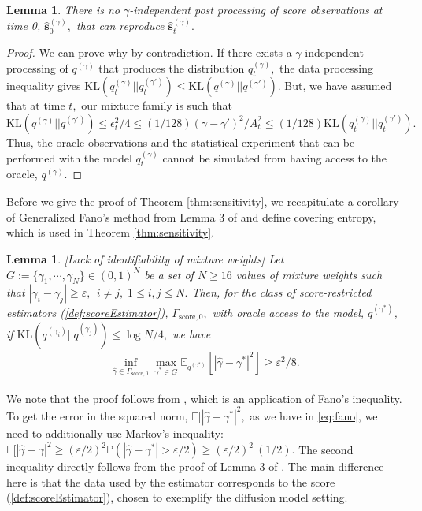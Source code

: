 \documentclass[11pt]{article}
\theoremstyle{plain}
\newtheorem{lemma}[theorem]{Lemma}
\newcommand{\1}{\mathbbm{1}}
\newcommand{\qdist}[2][]{q_{#1}^{(#2)}}
\begin{document}
\begin{appendices}
\begin{lemma}
\label{remark:dataProcessing} There is no $\gamma$-independent post processing of score observations at time 0, $\hat{\mathbf s}^{(\gamma)}_0,$ that can reproduce  $\hat{\mathbf s}^{(\gamma)}_t.$
\end{lemma}
\begin{proof}
We can prove why by contradiction. If there exists a $\gamma$-independent processing of $\qdist{\gamma}$ that produces the distribution $\qdist[t]{\gamma},$ the data processing inequality gives $\mathrm{KL}(\qdist[t]{\gamma}||\qdist[t]{\gamma'}) \leq \mathrm{KL}(\qdist{\gamma}||\qdist{\gamma'}).$ But, we have assumed that at time $t,$ our mixture family is such that $\mathrm{KL}(\qdist{\gamma}||\qdist{\gamma'}) \leq \epsilon_t^2/4 \leq (1/128) (\gamma - \gamma')^2/A_t^2 \leq (1/128)\mathrm{KL}(\qdist[t]{\gamma}||\qdist[t]{\gamma'}).$ Thus, the oracle observations and the statistical experiment that can be performed with the model $\qdist[t]{\gamma}$ cannot be simulated from having access to the oracle, $\qdist{\gamma}.$ 
\end{proof}

Before we give the proof of Theorem \ref{thm:sensitivity}, we recapitulate a corollary of Generalized Fano's method from Lemma 3 of \citep{binyu} and define covering entropy, which is used in Theorem \ref{thm:sensitivity}.
\begin{lemma}{[Lack of identifiability of mixture weights]} Let $G:= \{\gamma_1, \cdots, \gamma_N\} \in (0,1)^N$ be a set of $N\geq 16$ values of mixture weights such that $|\gamma_i - \gamma_j| \geq \varepsilon,\: \: i \neq j, \; 1\leq i,j \leq N.$ Then, for the class of score-restricted estimators (\cref{def:scoreEstimator}), $\Gamma_{\mathrm{score},0},$ with oracle access to the model, $\qdist{\gamma^*}$,   if $\mathrm{KL}(\qdist{\gamma_i}||\qdist{\gamma_j}) \leq \log N/4,$ we have
\begin{align}
\inf_{\hat{\gamma} \in \Gamma_{\mathrm{score},0}} \max_{\gamma^* \in G} \mathbb{E}_{\qdist{\gamma^*}} [|\hat{\gamma} - \gamma^*|^2] \geq \varepsilon^2/8.
\label{eq:fano}
\end{align}
\label{lem:fano}
\end{lemma}

We note that the proof follows from \citep[Lemma 3]{binyu}, which is an application of Fano's inequality. To get the error in the squared norm, $\mathbb{E}[|\hat{\gamma} - \gamma^*|^2,$ as we have in \eqref{eq:fano}, we need to additionally use Markov's inequality: $\mathbb{E}[|\hat{\gamma} - \gamma|^2 \geq (\varepsilon/2)^2 \mathbb{P}(|\hat{\gamma} - \gamma^*| > \varepsilon/2) \geq (\varepsilon/2)^2 \: (1/2).$ The second inequality directly follows from the proof of Lemma 3 of \citep{binyu}. The main difference here is that the data used by the estimator corresponds to the score (\cref{def:scoreEstimator}), chosen to exemplify the diffusion model setting.


\end{appendices}
\end{document}
